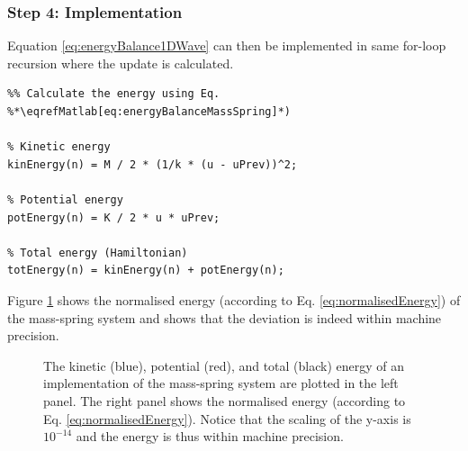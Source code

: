 {{\subsubsection{Step 4: Implementation}
Equation \eqref{eq:energyBalance1DWave} can then be implemented in same for-loop recursion where the update is calculated.  
\setlstMAT
\begin{lstlisting}
%% Calculate the energy using Eq. %*\eqrefMatlab[eq:energyBalanceMassSpring]*) 

% Kinetic energy
kinEnergy(n) = M / 2 * (1/k * (u - uPrev))^2;

% Potential energy
potEnergy(n) = K / 2 * u * uPrev;

% Total energy (Hamiltonian)
totEnergy(n) = kinEnergy(n) + potEnergy(n);
\end{lstlisting}
Figure \ref{fig:energyMassSpring} shows the normalised energy (according to Eq. \eqref{eq:normalisedEnergy}) of the mass-spring system and shows that the deviation is indeed within machine precision. 

\begin{figure}[h]
    \centering
      \caption{The kinetic (blue), potential (red), and total (black) energy of an implementation of the mass-spring system are plotted in the left panel. The right panel shows the normalised energy (according to Eq. \eqref{eq:normalisedEnergy}). Notice that the scaling of the y-axis is $10^{-14}$ and the energy is thus within machine precision. \label{fig:energyMassSpring}}
\end{figure}

}}
